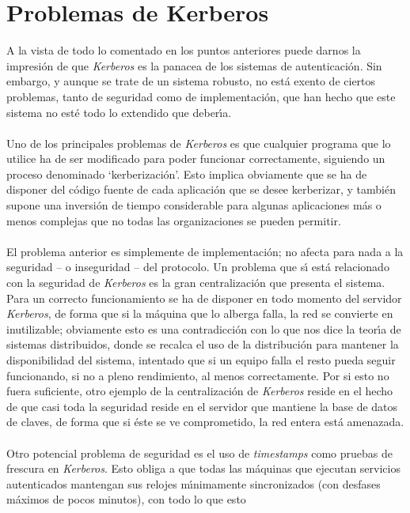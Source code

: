 \section{Problemas de Kerberos}
A la vista de todo lo comentado en los puntos anteriores puede darnos la
impresi\'on de que {\it Kerberos} es la panacea de los sistemas de 
autenticaci\'on. Sin embargo, y aunque se trate de un sistema robusto, no est\'a
exento de ciertos problemas, tanto de seguridad como de implementaci\'on, que
han hecho que este sistema no est\'e todo lo extendido que deber\'{\i}a.\\
\\Uno de los principales problemas de {\it Kerberos} es que cualquier programa
que lo utilice ha de ser modificado para poder funcionar correctamente, 
siguiendo un proceso denominado `kerberizaci\'on'. Esto implica obviamente que
se ha de disponer del c\'odigo fuente de cada aplicaci\'on que se desee 
kerberizar, y tambi\'en supone una inversi\'on de tiempo considerable para 
algunas aplicaciones m\'as o menos complejas que no todas las organizaciones se
pueden permitir.\\
\\El problema anterior es simplemente de implementaci\'on; no afecta para nada
a la seguridad -- o inseguridad -- del protocolo. Un problema que s\'{\i} est\'a
relacionado con la seguridad de {\it Kerberos} es la gran centralizaci\'on que
presenta el sistema. Para un correcto funcionamiento se ha de disponer en todo
momento del servidor {\it Kerberos}, de forma que si la m\'aquina que lo alberga
falla, la red se convierte en inutilizable; obviamente esto es una 
contradicci\'on con lo que nos dice la teor\'{\i}a de sistemas distribuidos, 
donde se recalca el uso de la distribuci\'on para mantener la disponibilidad del
sistema, intentado que si un equipo falla el resto pueda seguir funcionando, si
no a pleno rendimiento, al menos correctamente. Por si esto no fuera suficiente,
otro ejemplo de la centralizaci\'on de {\it Kerberos} reside en el hecho de que
casi toda la seguridad reside en el servidor que mantiene la base de datos de
claves, de forma que si \'este se ve comprometido, la red entera est\'a 
amenazada.\\
\\Otro potencial problema de seguridad es el uso de {\it timestamps} como 
pruebas de frescura en {\it Kerberos}. Esto obliga a que todas las m\'aquinas
que ejecutan servicios autenticados mantengan sus relojes m\'{\i}nimamente
sincronizados (con desfases m\'aximos de pocos minutos), con todo lo que esto
